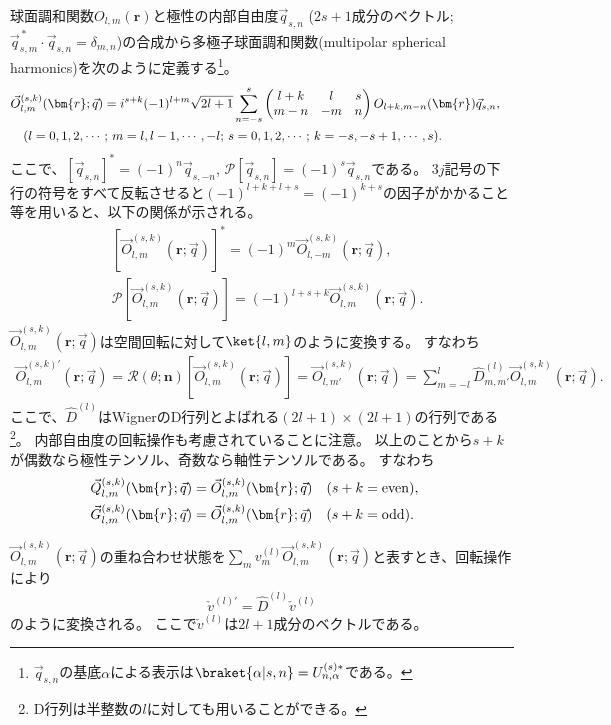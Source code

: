 \documentclass[11pt]{easymemo}
\begin{document}
球面調和関数$O_{l,m}(\bm{r})$と極性の内部自由度$\vec{q}_{s,n}$ ($2s+1$成分のベクトル; $\vec{q}_{s,m}^{\,*}\cdot\vec{q}_{s,n}=\delta_{m,n}$)の合成から多極子球面調和関数(multipolar spherical harmonics)を次のように定義する\footnote{$\vec{q}_{s,n}$の基底$\alpha$による表示は$\braket{\alpha|s,n}=U_{n,\alpha}^{(s)*}$である。}。
\begin{align}
&
\vec{O}_{l,m}^{(s,k)}(\bm{r};\vec{q})=i^{s+k}(-1)^{l+m}\sqrt{2l+1}\sum_{n=-s}^{s}
\begin{pmatrix} l+k & l & s \\ m-n & -m & n \end{pmatrix}O_{l+k,m-n}(\bm{r})\vec{q}_{s,n},
\cr&\quad
(l=0,1,2,\cdots;\,m=l,l-1,\cdots,-l;\,s=0,1,2,\cdots;\,k=-s,-s+1,\cdots,s).
\end{align}
ここで、$[\vec{q}_{s,n}]^{*}=(-1)^{n}\vec{q}_{s,-n}$, $\mathcal{P}[\vec{q}_{s,n}]=(-1)^{s}\vec{q}_{s,n}$である。
$3j$記号の下行の符号をすべて反転させると$(-1)^{l+k+l+s}=(-1)^{k+s}$の因子がかかること等を用いると、以下の関係が示される。
\begin{align}
&
[\vec{O}_{l,m}^{(s,k)}(\bm{r};\vec{q})]^{*}=(-1)^{m}\vec{O}_{l,-m}^{(s,k)}(\bm{r};\vec{q}),
\\&
\mathcal{P}[\vec{O}_{l,m}^{(s,k)}(\bm{r};\vec{q})]=(-1)^{l+s+k}\vec{O}_{l,m}^{(s,k)}(\bm{r};\vec{q}).
\end{align}
$\vec{O}_{l,m}^{(s,k)}(\bm{r};\vec{q})$は空間回転に対して$\ket{l,m}$のように変換する。
すなわち
\begin{align}
\vec{O}_{l,m}^{(s,k)'}(\bm{r};\vec{q})=\mathcal{R}(\theta;\bm{n})[\vec{O}_{l,m}^{(s,k)}(\bm{r};\vec{q})]
=\vec{O}_{l,m'}^{(s,k)}(\bm{r};\vec{q})=\sum_{m=-l}^{l}\hat{D}_{m,m'}^{(l)}\vec{O}_{l,m}^{(s,k)}(\bm{r};\vec{q}).
\end{align}
ここで、$\hat{D}^{(l)}$はWignerのD行列とよばれる$(2l+1)\times(2l+1)$の行列である\footnote{D行列は半整数の$l$に対しても用いることができる。}。
内部自由度の回転操作も考慮されていることに注意。
以上のことから$s+k$が偶数なら極性テンソル、奇数なら軸性テンソルである。
すなわち
\begin{align}
&
\vec{Q}_{l,m}^{(s,k)}(\bm{r};\vec{q})=\vec{O}_{l,m}^{(s,k)}(\bm{r};\vec{q})
\quad
(s+k={\rm even}),
\cr&
\vec{G}_{l,m}^{(s,k)}(\bm{r};\vec{q})=\vec{O}_{l,m}^{(s,k)}(\bm{r};\vec{q})
\quad
(s+k={\rm odd}).
\end{align}

$\vec{O}_{l,m}^{(s,k)}(\bm{r};\vec{q})$の重ね合わせ状態を$\sum_{m}v_{m}^{(l)}\vec{O}_{l,m}^{(s,k)}(\bm{r};\vec{q})$と表すとき、回転操作により
\begin{align}
\check{v}^{(l)'}=\hat{D}^{(l)}\check{v}^{(l)}
\end{align}
のように変換される。
ここで$\check{v}^{(l)}$は$2l+1$成分のベクトルである。
\end{document}

